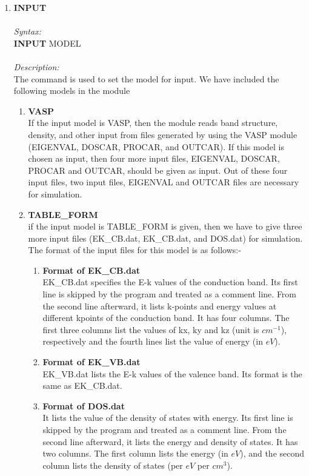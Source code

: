 \documentclass[12pt]{article}
\begin{document}
\begin{enumerate}
    \item \textbf{INPUT}   \\ \\
    \textit{Syntax:} \\
    \textbf{INPUT} MODEL \\ \\
    \textit{Description:} \\
    The command is used to set the model for input. We have included the following models in the module \\
    \begin{enumerate}
        \item \textbf{VASP} \\
        If the input model is VASP, then the module reads band structure, density, and other input from files generated by using the VASP module (EIGENVAL, DOSCAR, PROCAR, and OUTCAR). If this model is chosen as input, then four more input files, EIGENVAL, DOSCAR, PROCAR and OUTCAR, should be given as input. Out of these four input files, two input files, EIGENVAL and OUTCAR files are necessary for simulation. \\
        \item \textbf{TABLE\_FORM} \\
        if the input model is TABLE\_FORM is given, then we have to give three more input files (EK\_CB.dat, EK\_CB.dat, and DOS.dat) for simulation. The format of the input files for this model is as follows:-
        \begin{enumerate}
            \item \textbf{Format of EK\_CB.dat} \\
            EK\_CB.dat specifies the E-k values of the conduction band. Its first line is skipped by the program and treated as a comment line. From the second line afterward, it lists k-points and energy values at different kpoints of the conduction band. It has four columns. The first three columns list the values of kx, ky and kz (unit is $cm^{-1}$), respectively and the fourth lines list the value of energy (in $eV$).  \\
            \item \textbf{Format of EK\_VB.dat} \\
            EK\_VB.dat lists the E-k values of the valence band. Its format is the same as EK\_CB.dat. \\
            \item \textbf{Format of DOS.dat} \\
            It lists the value of the density of states with energy. Its first line is skipped by the program and treated as a comment line. From the second line afterward, it lists the energy and density of states. It has two columns. The first column lists the energy (in $eV$), and the second column lists the density of states (per $eV$ per $cm^3$). 
        \end{enumerate}
          

\end{enumerate}
\end{enumerate}
\end{document}
